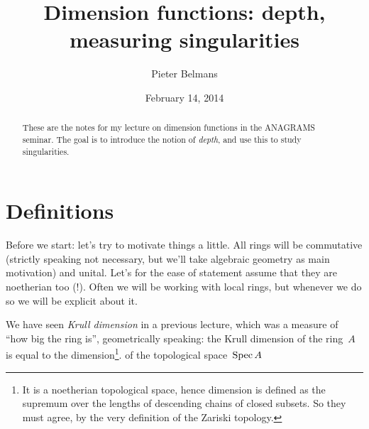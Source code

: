 \documentclass[10pt,a4paper]{article}
\title{Dimension functions: depth, measuring singularities}
\author{Pieter Belmans}
\date{February 14, 2014}
\begin{document}
\maketitle

\begin{abstract}
  These are the notes for my lecture on dimension functions in the ANAGRAMS seminar. The goal is to introduce the notion of \emph{depth}, and use this to study singularities.
\end{abstract}

\tableofcontents

\clearpage

\section{Definitions}
Before we start: let's try to motivate things a little. All rings will be commutative (strictly speaking not necessary, but we'll take algebraic geometry as main motivation) and unital. Let's for the ease of statement assume that they are noetherian too (!). Often we will be working with local rings, but whenever we do so we will be explicit about it.

We have seen \emph{Krull dimension} in a previous lecture, which was a measure of ``how big the ring is'', geometrically speaking: the Krull dimension of the ring~$A$ is equal to the dimension\footnote{It is a noetherian topological space, hence dimension is defined as the supremum over the lengths of descending chains of closed subsets. So they must agree, by the very definition of the Zariski topology.}. of the topological space~$\operatorname{Spec} A$
\end{document}
